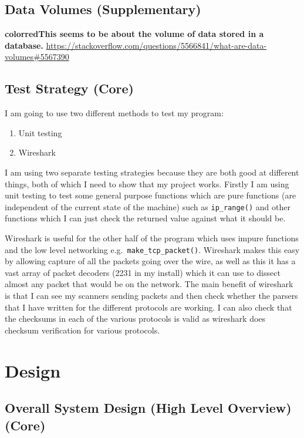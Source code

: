 \documentclass[titlepage]{article}
\begin{document}
\subsection{Data Volumes (Supplementary)}

\textbf{color{red}{This seems to be about the volume of data stored in a database.}}
\href{https://stackoverflow.com/questions/5566841/what-are-data-volumes#5567390}{https://stackoverflow.com/questions/5566841/what-are-data-volumes\#5567390}

\subsection{Test Strategy (Core)}

I am going to use two different methods to test my program:
\begin{enumerate}
\item{Unit testing}
\item{Wireshark}
\end{enumerate}
I am using two separate testing strategies because they are both good at different things,
both of which I need to show that my project works. Firstly I am using unit testing to test
some general purpose functions which are pure functions (are independent of the current state
of the machine) such as \verb|ip_range()| and other functions which I can
just check the returned value against what it should be.

Wireshark is useful for the other half of the program which uses impure functions and the
low level networking e.g.\ \verb|make_tcp_packet()|. Wireshark makes this easy by allowing capture of all
the packets going over the wire, as well as this it has a vast array of packet decoders (2231 in my install)
which it can use to dissect almost any packet that would be on the network. The main
benefit of wireshark is that I can see my scanners sending packets and then check whether the parsers
that I have written for the different protocols are working. I can also check that the checksums
in each of the various protocols is valid as wireshark does checksum verification for various protocols.

\section{Design}

\subsection{Overall System Design (High Level Overview) (Core)}
\end{document}
